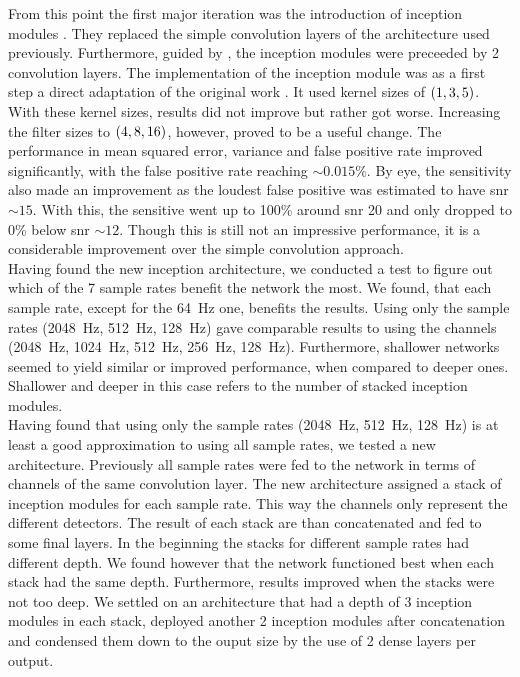 From this point the first major iteration was the introduction of inception modules \cite{inception_module}. They replaced the simple convolution layers of the architecture used previously.
 Furthermore, guided by \cite{inception_module}, the inception modules were preceeded by 2 convolution layers. The implementation of the inception module was as a first step a direct adaptation of the original work \cite{inception_module}. It used kernel sizes of ${\left( 1,3,5 \right)}$. With these kernel sizes, results did not improve but rather got worse. Increasing the filter sizes to ${\left( 4,8,16 \right)}$, however, proved to be a useful change. The performance in mean squared error, variance and false positive rate improved significantly, with the false positive rate reaching $\sim 0.015\%$. By eye, the sensitivity also made an improvement as the loudest false positive was estimated to have \gls{snr} $\sim 15$. With this, the sensitive went up to 100\% around \gls{snr} 20 and only dropped to 0\% below \gls{snr} $\sim 12$. Though this is still not an impressive performance, it is a considerable improvement over the simple convolution approach.\medskip\\
Having found the new inception architecture, we conducted a test to figure out which of the 7 sample rates benefit the network the most.
 We found, that each sample rate, except for the \SI{64}{\hertz} one, benefits the results. Using only the sample rates (\SI{2048}{\hertz}, \SI{512}{\hertz}, \SI{128}{\hertz}) gave comparable results to using the channels (\SI{2048}{\hertz}, \SI{1024}{\hertz}, \SI{512}{\hertz}, \SI{256}{\hertz}, \SI{128}{\hertz}). Furthermore, shallower networks seemed to yield similar or improved performance, when compared to deeper ones. Shallower and deeper in this case refers to the number of stacked inception modules.\medskip\\
Having found that using only the sample rates (\SI{2048}{\hertz}, \SI{512}{\hertz}, \SI{128}{\hertz}) is at least a good approximation to using all sample rates, we tested a new architecture. Previously all sample rates were fed to the network in terms of channels of the same convolution layer. The new architecture assigned a stack of inception modules for each sample rate. This way the channels only represent the different detectors. The result of each stack are than concatenated and fed to some final layers. In the beginning the stacks for different sample rates had different depth. We found however that the network functioned best when each stack had the same depth. Furthermore, results improved when the stacks were not too deep. We settled on an architecture that had a depth of 3 inception modules in each stack, deployed another 2 inception modules after concatenation and condensed them down to the ouput size by the use of 2 dense layers per output.\\
